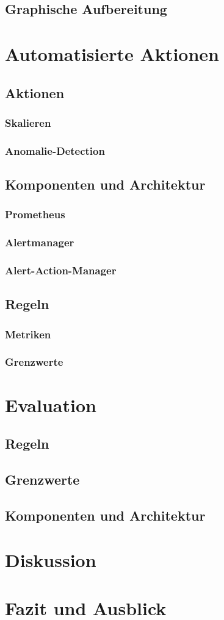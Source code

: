 \documentclass[a4paper,12pt]{scrartcl}
\begin{document}
\subsection{Graphische Aufbereitung}

\section{Automatisierte Aktionen}
\subsection{Aktionen}
\subsubsection{Skalieren}
\subsubsection{Anomalie-Detection}
\subsection{Komponenten und Architektur}
\subsubsection{Prometheus}
\subsubsection{Alertmanager}
\subsubsection{Alert-Action-Manager}
\subsection{Regeln}
\subsubsection{Metriken}
\subsubsection{Grenzwerte}

\section{Evaluation}
\subsection{Regeln}
\subsection{Grenzwerte}
\subsection{Komponenten und Architektur}

\section{Diskussion}
\section{Fazit und Ausblick}

\newpage

\end{document}
